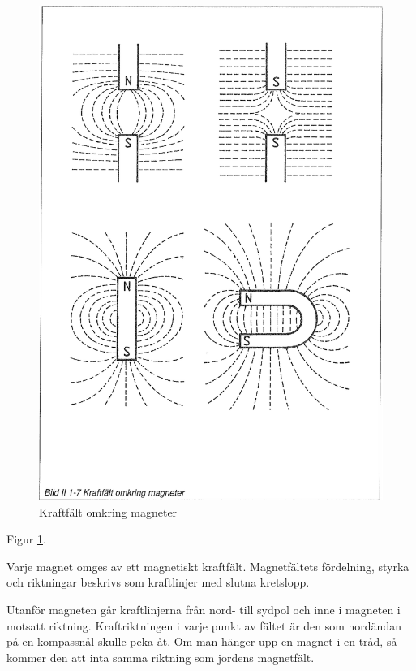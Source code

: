 \begin{figure}
\begin{center}
\includegraphics[width=14cm]{images/bild_2_1-07}
\caption{Kraftfält omkring magneter}
\label{fig:BildII1-7}
\end{center}
\end{figure}

Figur \ref{fig:BildII1-7}.

Varje magnet omges av ett magnetiskt kraftfält. Magnetfältets fördelning, styrka och
riktningar beskrivs som kraftlinjer med slutna kretslopp.

Utanför magneten går kraftlinjerna från nord- till sydpol och inne i magneten i motsatt
riktning. Kraftriktningen i varje punkt av fältet är den som nordändan på en kompassnål
skulle peka åt. Om man hänger upp en magnet i en tråd, så kommer den att inta
samma riktning som jordens magnetfält.

